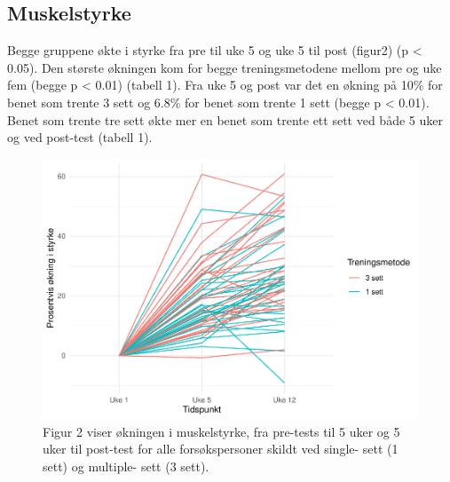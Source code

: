 \documentclass[
]{book}
\begin{document}
\hypertarget{muskelstyrke}{%
\subsection{Muskelstyrke}\label{muskelstyrke}}

Begge gruppene økte i styrke fra pre til uke 5 og uke 5 til post (figur2) (p \textless{} 0.05). Den største økningen kom for begge treningsmetodene mellom pre og uke fem (begge p \textless{} 0.01) (tabell 1). Fra uke 5 og post var det en økning på 10\% for benet som trente 3 sett og 6.8\% for benet som trente 1 sett (begge p \textless{} 0.01). Benet som trente tre sett økte mer en benet som trente ett sett ved både 5 uker og ved post-test (tabell 1).

\begin{figure}
\centering
\includegraphics{_main_files/figure-latex/styrkefigur-1.pdf}
\caption{\label{fig:styrkefigur}Figur 2 viser økningen i muskelstyrke, fra pre-tests til 5 uker og 5 uker til post-test for alle forsøkspersoner skildt ved single- sett (1 sett) og multiple- sett (3 sett).}
\end{figure}

\providecommand{\docline}[3]{\noalign{\global\setlength{\arrayrulewidth}{#1}}\arrayrulecolor[HTML]{#2}\cline{#3}}

\setlength{\tabcolsep}{2pt}

\renewcommand*{\arraystretch}{1.5}
\end{document}

